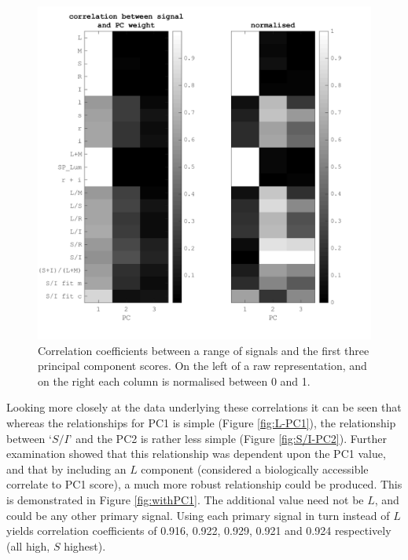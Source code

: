 \begin{figure}[htbp]
 \includegraphics[max width=\textwidth]{figs/comp/melcomp_3/19.png}
 \caption{Correlation coefficients between a range of signals and the first three principal component scores. On the left of a raw representation, and on the right each column is normalised between 0 and 1.}
 \label{fig:19}
\end{figure} 

Looking more closely at the data underlying these correlations it can be seen that whereas the relationships for \gls{PC1} is simple (Figure \ref{fig:L-PC1}), the relationship between `$S/I$' and the \gls{PC2} is rather less simple (Figure \ref{fig:S/I-PC2}). Further examination showed that this relationship was dependent upon the PC1 value, and that by including an $L$ component (considered a biologically accessible correlate to \gls{PC1} score), a much more robust relationship could be produced. This is demonstrated in Figure \ref{fig:withPC1}. The additional value need not be $L$, and could be any other primary signal. Using each primary signal in turn instead of $L$ yields correlation coefficients of 0.916, 0.922, 0.929, 0.921 and 0.924 respectively (all high, $S$ highest).

